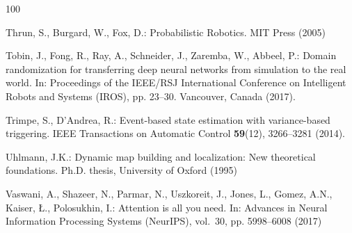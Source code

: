 \documentclass[graybox,envcountchap]{style/SNmono}
\begin{document}
\begin{thebibliography}{100}
{\par}
{\color{red} 
Thrun, S., Burgard, W., Fox, D.: Probabilistic Robotics.
\newblock MIT Press (2005)

\par}

Tobin, J., Fong, R., Ray, A., Schneider, J., Zaremba, W., Abbeel, P.: Domain
  randomization for transferring deep neural networks from simulation to the
  real world.
\newblock In: Proceedings of the IEEE/RSJ International Conference on
  Intelligent Robots and Systems (IROS), pp. 23--30. Vancouver, Canada (2017).
\newblock {}



Trimpe, S., D'Andrea, R.: Event-based state estimation with variance-based
  triggering.
\newblock IEEE Transactions on Automatic Control \textbf{59}(12), 3266--3281
  (2014).
\newblock {}


{\color{red} 
Uhlmann, J.K.: Dynamic map building and localization: New theoretical
  foundations.
\newblock Ph.D. thesis, University of Oxford (1995)

\par}
{\color{red} 
Vaswani, A., Shazeer, N., Parmar, N., Uszkoreit, J., Jones, L., Gomez, A.N.,
  Kaiser, {\L}., Polosukhin, I.: Attention is all you need.
\newblock In: Advances in Neural Information Processing Systems (NeurIPS),
  vol.~30, pp. 5998--6008 (2017)

\par}
\end{thebibliography}
\end{document}
